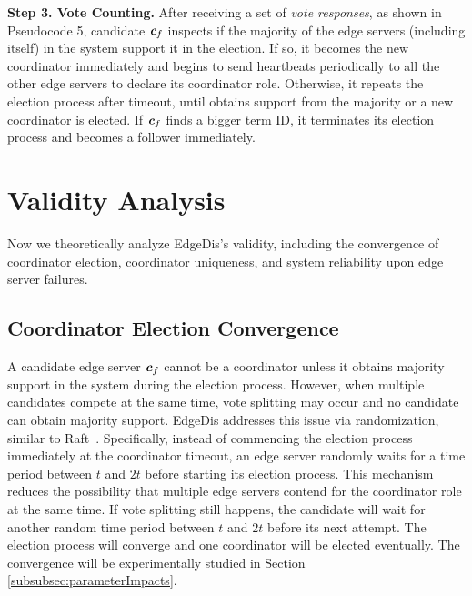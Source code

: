 \documentclass[10pt,journal,compsoc]{IEEEtran}
\def\mathbi#1{\textbf{\em #1}}
\begin{document}
\smallskip
\textbf{Step 3. Vote Counting.} After receiving a set of \textit{vote responses}, as shown in Pseudocode 5, candidate $\mathbi{c}_f$ inspects if the majority of the edge servers (including itself) in the system support it in the election. If so, it becomes the new coordinator immediately and begins to send heartbeats periodically to all the other edge servers to declare its coordinator role. Otherwise, it repeats the election process after timeout, until obtains support from the majority or a new coordinator is elected. If $\mathbi{c}_f$ finds a bigger term ID, it terminates its election process and becomes a follower immediately.







\section{Validity Analysis}
\label{sec:Validity_analysis}
Now we theoretically analyze EdgeDis's validity, including the convergence of coordinator election, coordinator uniqueness, and system reliability upon edge server failures.

\subsection{Coordinator Election Convergence}
\label{subSection:Convergence_CoordinatorElection}

A candidate edge server $\mathbi{c}_f$ cannot be a coordinator unless it obtains majority support in the system during the election process. However, when multiple candidates compete at the same time, vote splitting may occur and no candidate can obtain majority support. EdgeDis addresses this issue via randomization, similar to Raft~\cite{ongaro2014Raft}. Specifically, instead of commencing the election process immediately at the coordinator timeout, an edge server randomly waits for a time period between $t$ and $2t$ before starting its election process. This mechanism reduces the possibility that multiple edge servers contend for the coordinator role at the same time. If vote splitting still happens, the candidate will wait for another random time period between $t$ and $2t$ before its next attempt. The election process will converge and one coordinator will be elected eventually. The convergence will be experimentally studied in Section \ref{subsubsec:parameterImpacts}.
\end{document}
